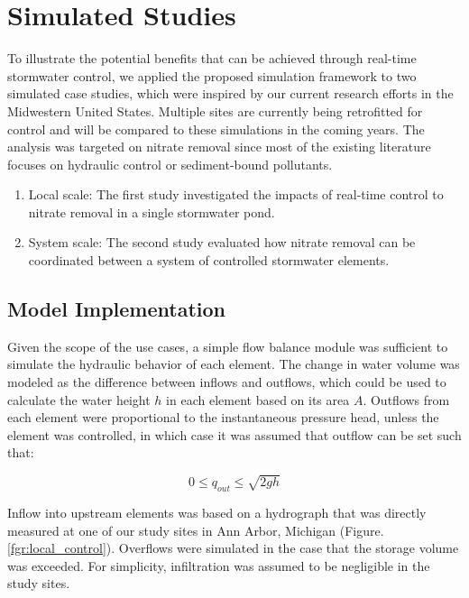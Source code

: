 

\section{Simulated Studies}

To illustrate the potential benefits that can be achieved through
  real-time stormwater control, we applied the proposed simulation framework to
  two simulated case studies, which were inspired by our current research
  efforts in the Midwestern United States. Multiple sites are currently being
  retrofitted for control  and will be compared to these simulations in the
  coming years. The analysis was targeted on nitrate removal since most of the
  existing literature focuses on hydraulic control or sediment-bound
  pollutants.

\begin{enumerate}
	\item  Local scale: The first study investigated the impacts of real-time control to nitrate removal in a single stormwater pond.
    \item System scale: The second study evaluated how nitrate removal can be coordinated between a system of controlled stormwater elements.
\end{enumerate}

\subsection{Model Implementation}
Given the scope of the use cases, a simple flow balance module was sufficient to simulate the hydraulic behavior of each element. The change in water volume was modeled as the difference between inflows and outflows, which could be used to calculate the water height $h$ in each element based on its area $A$. Outflows from each element were proportional to the instantaneous pressure head, unless the element was controlled, in which case it was assumed that outflow can be set such that:

\begin{equation} \label{outflow}
 0 \leq  q_{out}  \leq \sqrt{2  g  h}
\end{equation}

Inflow into upstream elements was based on a hydrograph  that was directly measured at one of our study sites in Ann Arbor, Michigan (Figure.\ref{fgr:local_control}). Overflows were simulated in the case that the storage volume was exceeded. For simplicity, infiltration was assumed to be negligible in the study sites. 

